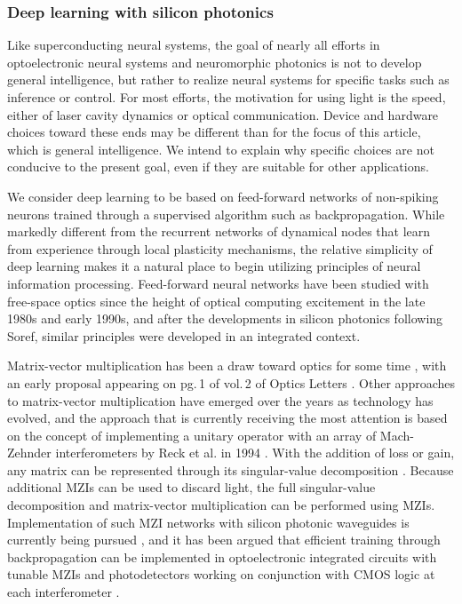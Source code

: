 \subsubsection{Deep learning with silicon photonics}
Like superconducting neural systems, the goal of nearly all efforts in optoelectronic neural systems and neuromorphic photonics is not to develop general intelligence, but rather to realize neural systems for specific tasks such as inference or control. For most efforts, the motivation for using light is the speed, either of laser cavity dynamics or optical communication. Device and hardware choices toward these ends may be different than for the focus of this article, which is general intelligence. We intend to explain why specific choices are not conducive to the present goal, even if they are suitable for other applications.

We consider deep learning to be based on feed-forward networks of non-spiking neurons trained through a supervised algorithm such as backpropagation. While markedly different from the recurrent networks of dynamical nodes that learn from experience through local plasticity mechanisms, the relative simplicity of deep learning makes it a natural place to begin utilizing principles of neural information processing. Feed-forward neural networks have been studied with free-space optics since the height of optical computing excitement in the late 1980s and early 1990s, and after the developments in silicon photonics following Soref, similar principles were developed in an integrated context. 

Matrix-vector multiplication has been a draw toward optics for some time \cite{godi1978,ve1984,maar1987}, with an early proposal appearing on pg.\,1 of vol.\,2 of Optics Letters \cite{godi1978}. Other approaches to matrix-vector multiplication have emerged over the years as technology has evolved, and the approach that is currently receiving the most attention is based on the concept of implementing a unitary operator with an array of Mach-Zehnder interferometers by Reck et al. in 1994 \cite{reze1994}. With the addition of loss or gain, any matrix can be represented through its singular-value decomposition \cite{st2016}. Because additional MZIs can be used to discard light, the full singular-value decomposition and matrix-vector multiplication can be performed using MZIs. Implementation of such MZI networks with silicon photonic waveguides is currently being pursued \cite{mi2015_fix_ref,shha2017}, and it has been argued that efficient training through backpropagation can be implemented in optoelectronic integrated circuits with tunable MZIs and photodetectors working on conjunction with CMOS logic at each interferometer \cite{humi2018}.

